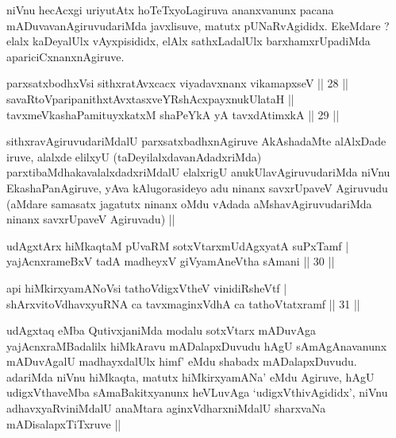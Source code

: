 \begin{artha}
niVnu hecAcxgi uriyutAtx hoTeTxyoLagiruva ananxvanunx pacana mADuvavanAgiruvudariMda javxlisuve, matutx pUNaRvAgididx. EkeMdare ? elalx kaDeyalUlx vAyxpisididx, elAlx sathxLadalUlx barxhamxrUpadiMda apariciCxnanxnAgiruve.
\end{artha}


\begin{shl}
parxsatxbodhxV\s si sithxratAvxcacx viyadavxnanx vikamapxseV \hfill|| 28 || \\
savaRtoV\s paripanithxtAvxtasxveYRshAcxpayxnukUlataH || \\
tavxmeVkashaPamituyxkatxM shaPeYkA yA tavxdAtimxkA \hfill|| 29 || 
\end{shl}

\begin{artha}
sithxravAgiruvudariMdalU parxsatxbadhxnAgiruve AkAshadaMte alAlxDade iruve, alalxde elilxyU (taDeyilalxdavanAdadxriMda) parxtibaMdhakavalalxdadxriMdalU elalxrigU anukUlavAgiruvudariMda niVnu EkashaPanAgiruve, yAva kAlugorasideyo adu ninanx savxrUpaveV Agiruvudu (aMdare samasatx jagatutx ninanx oMdu vAdada aMshavAgiruvudariMda ninanx savxrUpaveV Agiruvadu) ||
\end{artha}

\begin{shl}
udAgxtArx hiMkaqtaM pUvaRM sotxVtarxmUdAgxyatA suPxTamf | \\
yajAcnxrameBxV tadA madheyxV giVyamAneV\s tha sAmani \hfill|| 30 || 
\end{shl}

\begin{shl}
api hiMkirxyamANoV\s si tathoVdigxVtheV vinidiRsheVtf | \\
shArxvitoV\s dhavxyuRNA ca tavxmaginxVdhA ca tathoVtatxramf \hfill|| 31 || 
\end{shl}

\begin{artha}
udAgxtaq eMba QutivxjaniMda modalu sotxVtarx mADuvAga yajAcnxraMBadalilx hiMkAravu mADalapxDuvudu hAgU sAmAgAnavanunx mADuvAgalU madhayxdalUlx himf' eMdu shabadx mADalapxDuvudu. adariMda niVnu hiMkaqta, matutx hiMkirxyamANa' eMdu Agiruve, hAgU udigxVthaveMba sAmaBakitxyanunx heVLuvAga `udigxVthivAgididx', niVnu adhavxyaRviniMdalU anaMtara aginxVdharxniMdalU sharxvaNa mADisalapxTiTxruve ||
\end{artha}


